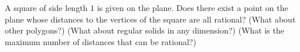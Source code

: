A square of side length $1$ is given on the plane.
Does there exist a point on the plane
whose distances to the vertices of the square
are all rational?
\newline
(What about other polygons?)
(What about regular solids in any dimension?)
(What is the maximum number of distances that can be rational?)
